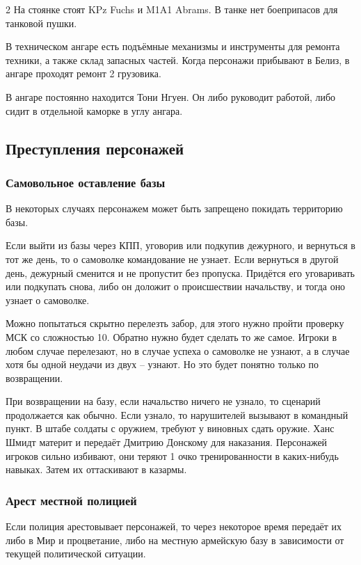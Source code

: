 \documentclass[twoside]{article}
\begin{document}
\begin{multicols}{2}
На стоянке стоят KPz Fuchs и M1A1 Abrams. В танке нет боеприпасов для
танковой пушки.

В техническом ангаре есть подъёмные механизмы и инструменты для ремонта
техники, а также склад запасных частей. Когда персонажи прибывают в
Белиз, в ангаре проходят ремонт 2 грузовика.

В ангаре постоянно находится Тони Нгуен. Он либо руководит работой, либо
сидит в отдельной каморке в углу ангара.

\subsection{Преступления персонажей}\label{character-crimes}

\subsubsection{Самовольное оставление базы}\label{unauthorized-departure}

В некоторых случаях персонажем может быть запрещено покидать территорию
базы.

Если выйти из базы через КПП, уговорив или подкупив дежурного, и
вернуться в тот же день, то о самоволке командование не узнает. Если
вернуться в другой день, дежурный сменится и не пропустит без пропуска.
Придётся его уговаривать или подкупать снова, либо он доложит о
происшествии начальству, и тогда оно узнает о самоволке.

Можно попытаться скрытно перелезть забор, для этого нужно пройти
проверку МСК со сложностью 10. Обратно нужно будет сделать то же самое.
Игроки в любом случае перелезают, но в случае успеха о самоволке не
узнают, а в случае хотя бы одной неудачи из двух -- узнают. Но это будет
понятно только по возвращении.

При возвращении на базу, если начальство ничего не узнало, то сценарий
продолжается как обычно. Если узнало, то нарушителей вызывают в
командный пункт. В штабе солдаты с оружием, требуют у виновных сдать
оружие. Ханс Шмидт материт и передаёт Дмитрию Донскому для наказания.
Персонажей игроков сильно избивают, они теряют 1 очко тренированности в
каких-нибудь навыках. Затем их оттаскивают в казармы.

\subsubsection{Арест местной полицией}\label{police-arrest}

Если полиция арестовывает персонажей, то через некоторое время передаёт
их либо в Мир и процветание, либо на местную армейскую базу в
зависимости от текущей политической ситуации.


\end{multicols}
\end{document}
